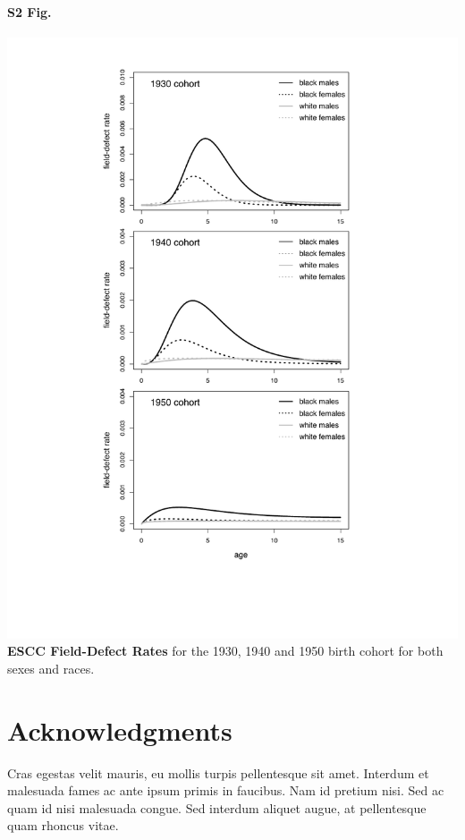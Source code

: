 \documentclass[10pt,letterpaper]{article}
\begin{document}
\paragraph*{\Large{S2 Fig.}}
\label{S2_Fig}
\includegraphics[scale=.85, trim=40 80 0 0]{S2 Fig.pdf}
{\bf ESCC Field-Defect Rates} for the 1930, 1940 and 1950 birth cohort for both sexes and races. 

\section*{Acknowledgments}
Cras egestas velit mauris, eu mollis turpis pellentesque sit amet. Interdum et malesuada fames ac ante ipsum primis in faucibus. Nam id pretium nisi. Sed ac quam id nisi malesuada congue. Sed interdum aliquet augue, at pellentesque quam rhoncus vitae.
\end{document}
